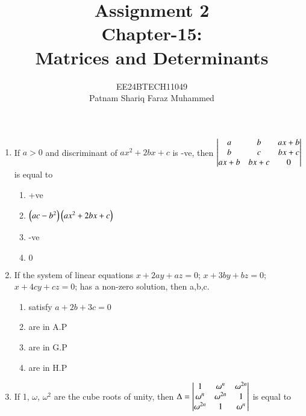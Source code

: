 \documentclass[journal]{IEEEtran}
\numberwithin{equation}{enumi}
\numberwithin{figure}{enumi}
\begin{document}


\title{Assignment 2 \\ Chapter-15: \\ Matrices and Determinants}
\author{EE24BTECH11049 \\ Patnam Shariq Faraz Muhammed}

{\let\newpage\relax\maketitle}

\begin{enumerate}

\item
	If $a>0$ and discriminant of $ax^{2}+2bx+c$ is -ve, then
	$\begin{vmatrix}a & b & ax+b \\ b & c & bx+c \\ ax+b & bx+c & 0\end{vmatrix}$ is equal to 
	
	\hfill{}	

	\begin{enumerate}
		\item +ve
		\item $\left(ac-b^2\right)\left(ax^2+2bx+c\right)$
		\item -ve
		\item $0$
	\end{enumerate}

\item
	If the system of linear equations $x+2ay+az = 0$; $x+3by+bz = 0$; $x+4cy+cz = 0$; has a non-zero solution, then a,b,c.

	\hfill{}

	\begin{enumerate}
                \item satisfy $a+ 2b+3c = 0$
                \item are in A.P
                \item are in G.P
                \item are in H.P
        \end{enumerate} 	

\item                    
	If 1, $\omega$, $\omega^{2}$ are the cube roots of unity, then
	$\Delta = \begin{vmatrix}1 & \omega^{n} & \omega^{2n} \\ \omega^{n} & \omega^{2n} & 1 \\ \omega^{2n} & 1 & \omega^{n}\end{vmatrix}$ is equal to 
        

\end{enumerate}
\end{document}
